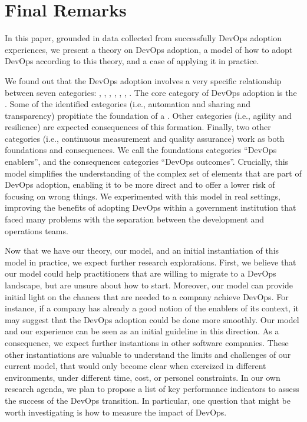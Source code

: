 \section{Final Remarks} \label{sec:conclusion}

In this paper, grounded in data collected from successfully DevOps adoption
experiences, we present a theory on DevOps adoption, a model of how to adopt
DevOps according to this theory, and a case of applying it in practice.

We found out that the DevOps adoption involves a very specific relationship between
seven categories: , , \cc, , , , .
The core category of DevOps adoption is the \cc. Some of the
identified categories (i.e., automation and sharing and transparency) propitiate
the foundation of a \cc. Other categories
(i.e., agility and resilience) are expected consequences of this formation.
Finally, two other categories (i.e., continuous measurement and quality
assurance) work as both foundations and consequences. We call the foundations
categories ``DevOps enablers'', and the consequences categories ``DevOps outcomes''.
Crucially, this model simplifies the understanding of the
complex set of elements that are part of DevOps adoption, enabling it to be
more direct and to offer a lower risk of focusing on wrong things.
We experimented with
this model in real settings, improving the benefits of adopting DevOps
within a government institution that faced many problems with the separation between the
development and operations teams.

Now that we have our theory, our model, and an initial instantiation of this model
in practice, we expect further research explorations. First,
we believe that our model could help practitioners that are willing
to migrate to a DevOps landscape, but are unsure about how to start.
Moreover, our model can provide initial light on the chances that are
needed to a company achieve DevOps. For instance, if a company has already
a good notion of the enablers of its context, it may suggest that the
DevOps adoption could be done more smoothly.
Our model and our experience can be seen as an initial guideline in
this direction.
As a consequence, we expect further instantions in other software companies.
These other instantiations are valuable to understand the limits and challenges
of our current model, that would only become clear when exercized in different
environments, under different time, cost, or personel constraints.
In our own research agenda, we plan to propose a list of key performance indicators to
assess the success of the DevOps transition. In particular, one question that
might be worth investigating is how to measure the impact of DevOps.
